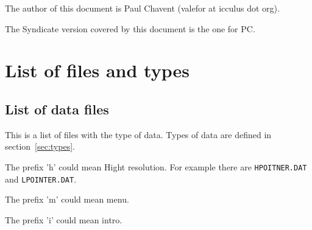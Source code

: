 \documentclass[a4paper,twoside,12pt,dvips]{article}
\begin{document}
The author of this document is Paul Chavent (valefor at icculus dot org).


The Syndicate version covered by this document is the one for PC.


\section{List of files and types}
\label{sec:files_and_types}

\subsection{List of data files}
\label{sec:files}

This is a list of files with the type of data. Types of data are defined in section~\ref{sec:types}.

The prefix 'h' could mean Hight resolution. For example there are \texttt{HPOITNER.DAT} and \texttt{LPOINTER.DAT}.

The prefix 'm' could mean menu.

The prefix 'i' could mean intro.
\end{document}
